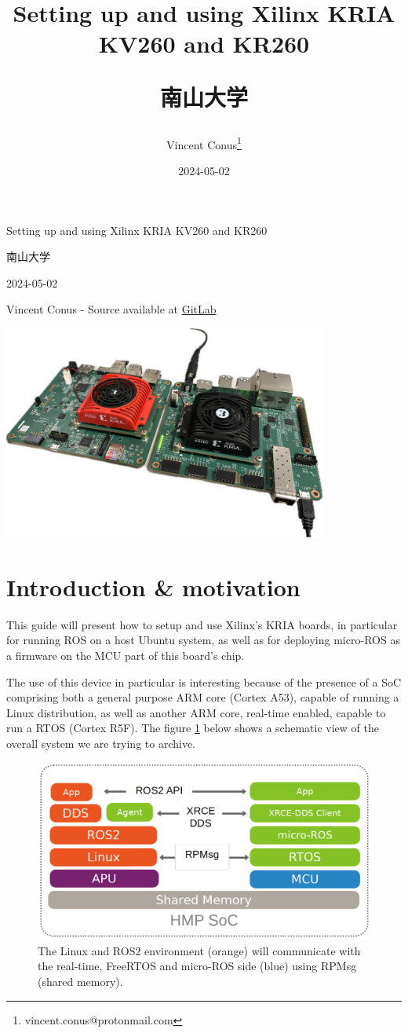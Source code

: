 \documentclass[10pt]{article}
\author{Vincent Conus\thanks{vincent.conus@protonmail.com}}
\date{2024-05-02}
\title{Setting up and using Xilinx KRIA KV260 and KR260\\\medskip
\large \begin{CJK}{UTF8}{min}南山大学\end{CJK}}
\newcommand{\gitlab}[1]{%
\href{#1}{GitLab \faGitlab}}
\begin{document}
\begin{titlepage}
\centering
{\LARGE Setting up and using Xilinx KRIA KV260 and KR260 \par }
\vspace{5mm}
{\large \begin{CJK}{UTF8}{min}南山大学\end{CJK} \par}
\vspace{1cm}
{\large 2024-05-02 \par}
\vspace{2cm}
{\large Vincent Conus -  Source available at \gitlab{https://gitlab.com/sunoc/xilinx-kria-kv260-documentation} \par}
\vspace{3cm}
\includegraphics[width=0.8\textwidth]{./img/boards}\end{titlepage}
\tableofcontents
\pagebreak
\section{Introduction \& motivation}
\label{sec:org608ce9a}
This guide will present how to setup and use Xilinx's KRIA boards, in particular
for running ROS on a host Ubuntu system, as well as for deploying
micro-ROS\cite{Belsare2023} as a firmware on the MCU part of this board's chip.

The use of this device in particular is interesting because of the presence of a
SoC comprising both a general purpose ARM core (Cortex A53), capable of running a Linux
distribution, as well as another ARM core, real-time enabled, capable to run a
RTOS (Cortex R5F). The figure \ref{fig:org262c6e0} below shows a schematic view of the overall system we
are trying to archive.

\begin{figure}[htbp]
\centering
\includegraphics[width=.6\textwidth]{img/map.png}
\caption{\label{fig:org262c6e0}The Linux and ROS2 environment (orange) will communicate with the real-time, FreeRTOS and micro-ROS side (blue) using RPMsg (shared memory).}
\end{figure}
\end{document}
